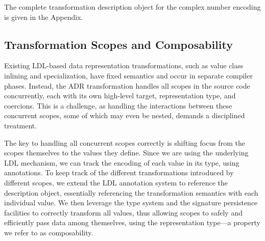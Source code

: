 The complete transformation description object for the complex number encoding is given in the Appendix.



\subsection{Transformation Scopes and Composability}
\label{sec:ildl:scoped}

Existing LDL-based data representation transformations, such as value class inlining and specialization, have fixed semantics and occur in separate compiler phases. Instead, the ADR transformation handles all scopes in the source code concurrently, each with its own high-level target, representation type, and coercions. This is a challenge, as handling the interactions between these concurrent scopes, some of which may even be nested, demands a disciplined treatment.


The key to handling all concurrent scopes correctly is shifting focus from the scopes themselves to the values they define. Since we are using the underlying LDL mechanism, we can track the encoding of each value in its type, using annotations. To keep track of the different transformations introduced by different scopes, we extend the LDL annotation system to reference the description object, essentially referencing the   transformation semantics with each individual value. We then leverage the type system and the signature persistence facilities to correctly transform all values, thus allowing scopes to safely and efficiently pass data among themselves, using the representation type---a property we refer to as composability.

